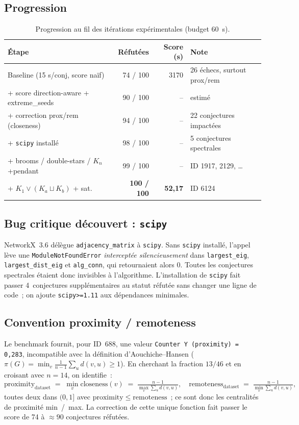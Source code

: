 \documentclass[11pt,a4paper]{article}
\begin{document}
\subsection{Progression}

\begin{table}[h]\centering\small
\begin{tabular}{lrrl}
\toprule
Étape & Réfutées & Score (s) & Note \\
\midrule
Baseline (15 s/conj, score naïf)         &  74 / 100 & 3170 & 26 échecs, surtout prox/rem \\
+ score direction-aware + extreme\_seeds &  90 / 100 & --   & estimé \\
+ correction prox/rem (closeness)        &  94 / 100 & --   & 22 conjectures impactées \\
+ \texttt{scipy} installé                &  98 / 100 & --   & 5 conjectures spectrales \\
+ brooms / double-stars / $K_n$+pendant  &  99 / 100 & --   & ID 1917, 2129, \ldots\\
+ $K_1 \vee (K_a \sqcup K_b)$ + sat.     & \textbf{100 / 100} & \textbf{52{,}17} &
  ID 6124 \\
\bottomrule
\end{tabular}
\caption{Progression au fil des itérations expérimentales (budget 60~s).}
\end{table}

\subsection{Bug critique découvert : \texttt{scipy}}

NetworkX~3.6 délègue \texttt{adjacency\_matrix} à \texttt{scipy}. Sans
\texttt{scipy} installé, l'appel lève une \texttt{ModuleNotFoundError}
\emph{interceptée silencieusement} dans \texttt{largest\_eig},
\texttt{largest\_dist\_eig} et \texttt{alg\_conn}, qui retournaient alors $0$.
Toutes les conjectures spectrales étaient donc invisibles à l'algorithme.
L'installation de \texttt{scipy} fait passer 4~conjectures supplémentaires
au statut \og{}réfutée\fg{} sans changer une ligne de code~; on ajoute
\texttt{scipy>=1.11} aux dépendances minimales.

\subsection{Convention proximity / remoteness}

Le benchmark fournit, pour ID~688, une valeur \texttt{Counter Y (proximity) =
0{,}283}, incompatible avec la définition d'Aouchiche–Hansen
($\pi(G) = \min_v \frac{1}{n-1}\sum_u d(v,u) \ge 1$). En cherchant la
fraction $13/46$ et en croisant avec $n=14$, on identifie~:
\[
  \mathrm{proximity}_{\text{dataset}}
  \;=\; \min_v \mathrm{closeness}(v)
  \;=\; \tfrac{n-1}{\max_v \sum_u d(v,u)},
  \quad
  \mathrm{remoteness}_{\text{dataset}}
  \;=\; \tfrac{n-1}{\min_v \sum_u d(v,u)},
\]
toutes deux dans $(0,1]$ avec
$\mathrm{proximity}\le\mathrm{remoteness}$~; ce sont donc les
centralités de proximité min~/~max. La correction de cette unique fonction
fait passer le score de 74 à $\approx 90$ conjectures réfutées.
\end{document}
